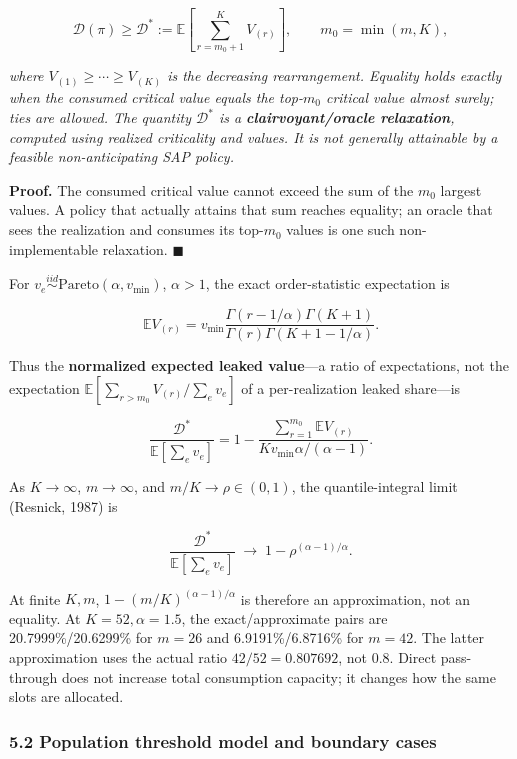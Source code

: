 \documentclass[
  11pt]{article}
\begin{document}
\[\mathcal D(\pi)\ge\mathcal D^*:=\mathbb E\!\left[\sum_{r=m_0+1}^{K}V_{(r)}\right],\qquad m_0=\min(m,K),\tag{5}\]

\emph{where \(V_{(1)}\ge\cdots\ge V_{(K)}\) is the decreasing
rearrangement. Equality holds exactly when the consumed critical value
equals the top-\(m_0\) critical value almost surely; ties are allowed.
The quantity \(\mathcal D^*\) is a \textbf{clairvoyant/oracle
relaxation}, computed using realized criticality and values. It is not
generally attainable by a feasible non-anticipating SAP policy.}

\textbf{Proof.} The consumed critical value cannot exceed the sum of the
\(m_0\) largest values. A policy that actually attains that sum reaches
equality; an oracle that sees the realization and consumes its
top-\(m_0\) values is one such non-implementable relaxation.
\(\blacksquare\)

For \(v_e\overset{iid}{\sim}\mathrm{Pareto}(\alpha,v_{\min})\),
\(\alpha>1\), the exact order-statistic expectation is

\[\mathbb E V_{(r)}=v_{\min}\frac{\Gamma(r-1/\alpha)\Gamma(K+1)}{\Gamma(r)\Gamma(K+1-1/\alpha)}.\]

Thus the \textbf{normalized expected leaked value}---a ratio of
expectations, not the expectation
\(\mathbb E[\sum_{r>m_0}V_{(r)}/\sum_e v_e]\) of a per-realization
leaked share---is

\[\frac{\mathcal D^*}{\mathbb E[\sum_e v_e]}=1-\frac{\sum_{r=1}^{m_0}\mathbb E V_{(r)}}{Kv_{\min}\alpha/(\alpha-1)}.\tag{6}\]

As \(K\to\infty\), \(m\to\infty\), and \(m/K\to\rho\in(0,1)\), the
quantile-integral limit (Resnick, 1987) is

\[\frac{\mathcal D^*}{\mathbb E[\sum_e v_e]}\;\longrightarrow\;1-\rho^{(\alpha-1)/\alpha}.\]

At finite \(K,m\), \(1-(m/K)^{(\alpha-1)/\alpha}\) is therefore an
approximation, not an equality. At \(K=52,\alpha=1.5\), the
exact/approximate pairs are 20.7999\%/20.6299\% for \(m=26\) and
6.9191\%/6.8716\% for \(m=42\). The latter approximation uses the actual
ratio \(42/52=0.807692\), not 0.8. Direct pass-through does not increase
total consumption capacity; it changes how the same slots are allocated.

\subsubsection{5.2 Population threshold model and boundary
cases}\label{population-threshold-model-and-boundary-cases}
\end{document}
